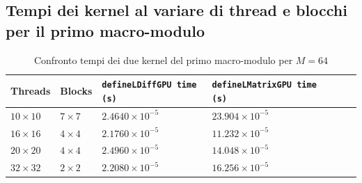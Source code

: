 
\subsection{Tempi dei kernel al variare di thread e blocchi per il primo macro-modulo}
\begin{table}[h!]
    \centering
    \begin{tabularx}{1\textwidth} { 
      | >{\centering\arraybackslash}X 
      | >{\centering\arraybackslash}X
      | >{\centering\arraybackslash}X
      | >{\centering\arraybackslash}X
      | >{\centering\arraybackslash}X
      | >{\centering\arraybackslash}X
      | >{\centering\arraybackslash}X|
    }
    \hline Threads & Blocks & \texttt{defineLDiffGPU time (s)} & \texttt{defineLMatrixGPU time (s)} \\
    \hline $10 \times 10$ & $7 \times 7$ & $2.4640 \times 10^{-5}$ & $23.904 \times 10^{-5}$ \\
    \hline $16 \times 16$ & $4 \times 4$ & $2.1760 \times 10^{-5}$ & $11.232 \times 10^{-5}$ \\
    \hline $20 \times 20$ & $4 \times 4$ & $2.4960 \times 10^{-5}$ & $14.048 \times 10^{-5}$ \\
    \hline $32 \times 32$ & $2 \times 2$ & $2.2080 \times 10^{-5}$ & $16.256 \times 10^{-5}$ \\
    \hline
    \end{tabularx}
    \caption{Confronto tempi dei due kernel del primo macro-modulo per $M = 64$} 
    \label{tab:kernels_first_macro_module_time}
\end{table}

